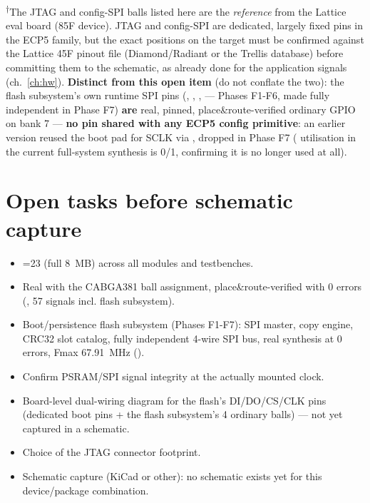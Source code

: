 \begin{fnwarn}
\textsuperscript{$\dagger$}The JTAG and config-SPI balls listed here are the \emph{reference}
from the Lattice eval board (85F device). JTAG and config-SPI are dedicated, largely fixed
pins in the ECP5 family, but the exact positions on the  target must
be confirmed against the Lattice 45F pinout file (Diamond/Radiant or the Trellis database)
before committing them to the schematic, as already done for the application signals
(ch.~\ref{ch:hw}).
\textbf{Distinct from this open item} (do not conflate the two): the flash subsystem's own
runtime SPI pins (, , ,
 --- Phases F1-F6, made fully independent in Phase F7) \textbf{are} real,
pinned, place\&route-verified ordinary GPIO on bank 7 --- \textbf{no pin shared with any
ECP5 config primitive}: an earlier version reused the boot  pad for SCLK via
, dropped in Phase F7 ( utilisation in the current full-system
synthesis is 0/1, confirming it is no longer used at all).
\end{fnwarn}

\section{Open tasks before schematic capture}
\begin{itemize}
\item[\OK] =23 (full 8~MB) across all modules and testbenches.
\item[\OK] Real  with the CABGA381 ball assignment, place\&route-verified with
0 errors (, 57 signals incl. flash subsystem).
\item[\OK] Boot/persistence flash subsystem (Phases F1-F7): SPI master, copy engine,
CRC32 slot catalog, fully independent 4-wire SPI bus, real synthesis at 0 errors, Fmax
67.91~MHz ().
\item[$\square$] Confirm PSRAM/SPI signal integrity at the actually mounted clock.
\item[$\square$] Board-level dual-wiring diagram for the flash's DI/DO/CS/CLK pins (dedicated
      boot pins + the flash subsystem's 4 ordinary balls) --- not yet captured in a schematic.
\item[$\square$] Choice of the JTAG connector footprint.
\item[$\square$] Schematic capture (KiCad or other): no schematic exists yet for this
device/package combination.
\end{itemize}
